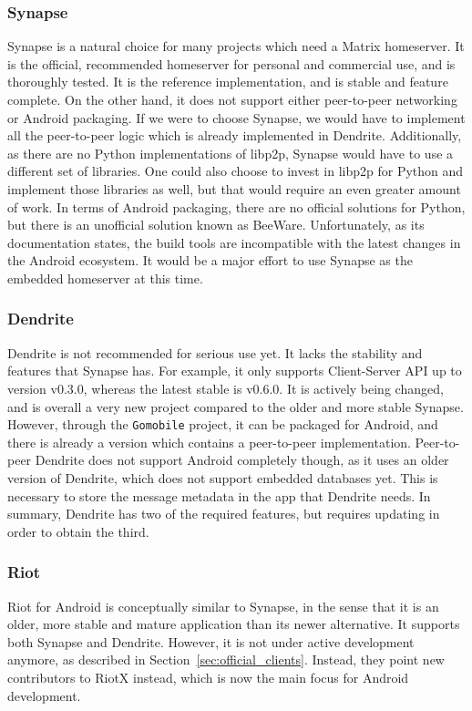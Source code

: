 \subsubsection{Synapse}
Synapse is a natural choice for many projects which need a Matrix homeserver.
It is the official, recommended homeserver for personal and commercial use, and is thoroughly tested.
It is the reference implementation, and is stable and feature complete.
On the other hand, it does not support either peer-to-peer networking or Android packaging.
If we were to choose Synapse, we would have to implement all the peer-to-peer logic which is already implemented in Dendrite.
Additionally, as there are no Python implementations of libp2p, Synapse would have to use a different set of libraries.
One could also choose to invest in libp2p for Python and implement those libraries as well, but that would require an even greater amount of work.
In terms of Android packaging, there are no official solutions for Python, but there is an unofficial solution known as BeeWare\footnotemark.
Unfortunately, as its documentation states\footnotemark, the build tools are incompatible with the latest changes in the Android ecosystem.
It would be a major effort to use Synapse as the embedded homeserver at this time.

\subsubsection{Dendrite}
Dendrite is not recommended for serious use yet.
It lacks the stability and features that Synapse has.
For example, it only supports Client-Server API up to version v0.3.0, whereas the latest stable is v0.6.0.
It is actively being changed, and is overall a very new project compared to the older and more stable Synapse.
However, through the \texttt{Gomobile} project, it can be packaged for Android, and there is already a version which contains a peer-to-peer implementation.
Peer-to-peer Dendrite does not support Android completely though, as it uses an older version of Dendrite, which does not support embedded databases yet.
This is necessary to store the message metadata in the app that Dendrite needs.
In summary, Dendrite has two of the required features, but requires updating in order to obtain the third.

\subsubsection{Riot}
Riot for Android is conceptually similar to Synapse, in the sense that it is an older, more stable and mature application than its newer alternative.
It supports both Synapse and Dendrite.
However, it is not under active development anymore, as described in Section~\ref{sec:official_clients}.
Instead, they point new contributors to RiotX instead, which is now the main focus for Android development.

